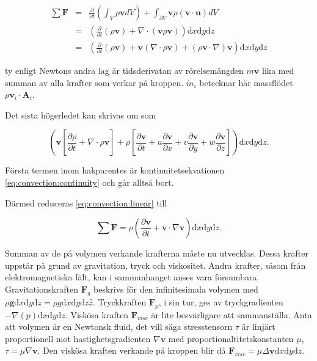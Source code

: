 \begin{eqnarray}
\label{eq:convection:linear}
\sum \mathbf{F} & = & \frac{\partial}{\partial t} \left( \int_V \rho\mathbf{v} dV \right) + \int_{\partial V} \mathbf{v}\rho\left( \mathbf{v} \cdot \mathbf{n}\right)dV \nonumber \\
& = &\left(\frac{\partial}{\partial t} \left( \rho\mathbf{v} \right) + \nabla \cdot \left( \mathbf{v} \rho \mathbf{v}\right)\right)\mathrm{d}x\mathrm{d}y\mathrm{d}z \nonumber\\
& = &\left( \frac{\partial}{\partial t} \left( \rho\mathbf{v} \right) + \mathbf{v}\left(\nabla\cdot\rho\mathbf{v}\right) + \left(\rho\mathbf{v} \cdot \nabla\right) \mathbf{v}\right) \mathrm{d}x\mathrm{d}y\mathrm{d}z
\end{eqnarray}

ty enligt Newtons andra lag är tidsderivatan av rörelsemängden $m\mathbf{v}$ lika med summan av alla krafter som verkar på kroppen. $\dot{m}_i$ betecknar här massflödet $\rho\mathbf{v}_i\cdot\mathbf{A}_i$.

Det sista högerledet kan skrivas om som

\begin{equation}
\left( \mathbf{v}\left[ \frac{\partial \rho}{\partial t} + \nabla\cdot \rho \mathbf{v}\right] + \rho\left[ \frac{\partial \mathbf{v}}{\partial t} + u\frac{\partial\mathbf{v}}{\partial x} + v\frac{\partial\mathbf{v}}{\partial y} + w\frac{\partial\mathbf{v}}{\partial z} \right]\right)\mathrm{d}x\mathrm{d}y\mathrm{d}z.
\end{equation}

Första termen inom hakparentes är kontinuitetsekvationen \eqref{eq:convection:continuity} och går alltså bort.

Därmed reduceras \eqref{eq:convection:linear} till

\begin{equation}
\label{eq:convection:linearfinal}
\sum \mathbf{F} = \rho \left( \frac{\partial \mathbf{v}}{\partial t} + \mathbf{v}\cdot \nabla\mathbf{v} \right)\mathrm{d}x\mathrm{d}y\mathrm{d}z.
\end{equation}

Summan av de på volymen verkande krafterna måste nu utvecklas. Dessa krafter uppstår på grund av gravitation, tryck och viskositet. Andra krafter, såsom från elektromagnetiska fält, kan i sammanhanget anses vara försumbara. Gravitationskraften $\mathbf{F}_g$ beskrivs för den infinitesimala volymen med $\rho \mathbf{g} \mathrm{d}x\mathrm{d}y\mathrm{d}z = \rho g \mathrm{d}x\mathrm{d}y\mathrm{d}z \hat{z}$. Tryckkraften $\mathbf{F}_p$, i sin tur, ges av tryckgradienten $-\nabla \left( p \right) \mathrm{d}x\mathrm{d}y\mathrm{d}z$. Viskösa kraften $\mathbf{F}_{visc}$ är lite besvärligare att sammanställa. Anta att volymen är en Newtonsk fluid, det vill säga stresstensorn $\tau$ är linjärt proportionell mot hastighetsgradienten $\nabla\mathbf{v}$ med proportionaltitetskonstanten $\mu$, $\tau = \mu \nabla \mathbf{v}$. Den viskösa kraften verkande på kroppen blir då $\mathbf{F}_{visc} = \mu\Delta\mathbf{v}\mathrm{d}x\mathrm{d}y\mathrm{d}z$.

